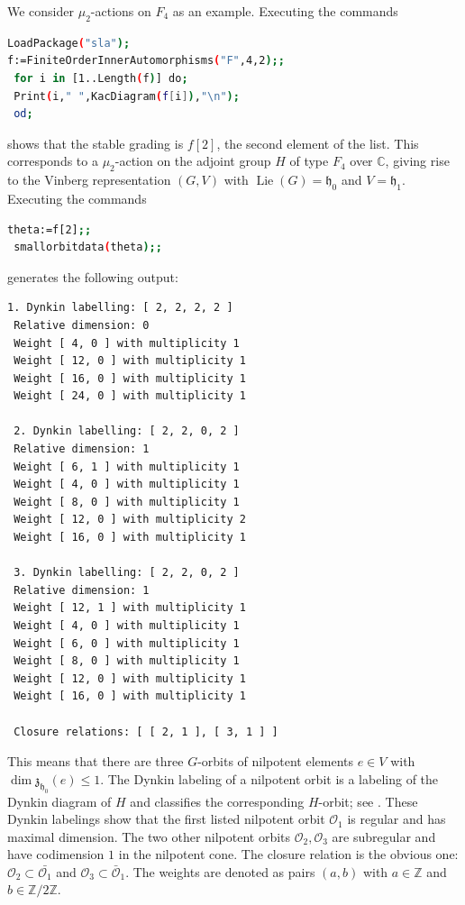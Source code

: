 \documentclass{article} %
\numberwithin{equation}{section}
\theoremstyle{definition}
\DeclareMathOperator{\Lie}{Lie}
\newcommand{\Z}{\mathbb{Z}}
\newcommand{\calO}{\mathcal{O}}
\newcommand{\frakh}{\mathfrak h}
\newcommand{\frakz}{\mathfrak z}
\begin{document}
We consider $\mu_2$-actions on $F_4$ as an example.
Executing the commands
\begin{lstlisting}[language=bash]
LoadPackage("sla");
f:=FiniteOrderInnerAutomorphisms("F",4,2);;
 for i in [1..Length(f)] do;
 Print(i," ",KacDiagram(f[i]),"\n");
 od;
\end{lstlisting}
 shows that the stable grading is $f[2]$, the second element of the list. 
 This corresponds to a $\mu_2$-action on the adjoint group $H$ of type $F_4$ over $\mathbb{C}$, giving rise to the Vinberg representation $(G,V)$ with $\Lie(G) = \frakh_0$ and $V = \frakh_1$.
 Executing the commands
 \begin{lstlisting}[language=bash]
 theta:=f[2];;
 smallorbitdata(theta);;\end{lstlisting}
 generates the following output:
 \begin{lstlisting}[language=bash]
 1. Dynkin labelling: [ 2, 2, 2, 2 ]
 Relative dimension: 0
 Weight [ 4, 0 ] with multiplicity 1
 Weight [ 12, 0 ] with multiplicity 1
 Weight [ 16, 0 ] with multiplicity 1
 Weight [ 24, 0 ] with multiplicity 1

 2. Dynkin labelling: [ 2, 2, 0, 2 ]
 Relative dimension: 1
 Weight [ 6, 1 ] with multiplicity 1
 Weight [ 4, 0 ] with multiplicity 1
 Weight [ 8, 0 ] with multiplicity 1
 Weight [ 12, 0 ] with multiplicity 2
 Weight [ 16, 0 ] with multiplicity 1

 3. Dynkin labelling: [ 2, 2, 0, 2 ]
 Relative dimension: 1
 Weight [ 12, 1 ] with multiplicity 1
 Weight [ 4, 0 ] with multiplicity 1
 Weight [ 6, 0 ] with multiplicity 1
 Weight [ 8, 0 ] with multiplicity 1
 Weight [ 12, 0 ] with multiplicity 1
 Weight [ 16, 0 ] with multiplicity 1

 Closure relations: [ [ 2, 1 ], [ 3, 1 ] ]\end{lstlisting}
 This means that there are three $G$-orbits of nilpotent elements $e\in V$ with $\dim \frakz_{\frakh_0}(e)\leq 1$.
 The Dynkin labeling of a nilpotent orbit is a labeling of the Dynkin diagram of $H$ and classifies the corresponding $H$-orbit; see \cite[Section 7.3]{Slodowy-simplesingularitiesalggroups}.
 These Dynkin labelings show that the first listed nilpotent orbit $\calO_1$ is regular and has maximal dimension.
 The two other nilpotent orbits $\mathcal{O}_2, \mathcal{O}_3$ are subregular and have codimension $1$ in the nilpotent cone. 
  The closure relation is the obvious one: $\mathcal{O}_2\subset \bar{\calO_1}$ and $\mathcal{O}_3\subset \bar{\calO}_1$.
 The weights are denoted as pairs $(a,b)$ with $a\in \Z$ and $b\in \Z/2\Z$.
\end{document}
